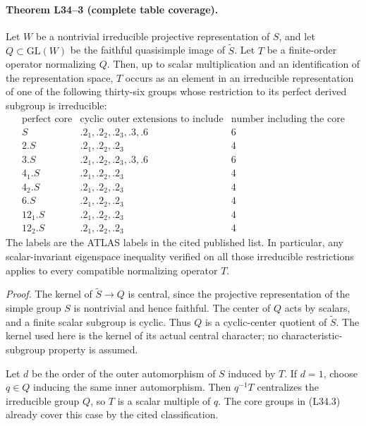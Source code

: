 \paragraph{Theorem L34--3 (complete table coverage).}
Let $W$ be a nontrivial irreducible projective representation of $S$,
and let $Q\subset\mathrm{GL}(W)$ be the faithful quasisimple image
of $\widetilde S$.  Let $T$ be a finite-order operator normalizing
$Q$.  Then, up to scalar multiplication and an identification of the
representation space, $T$ occurs as an element in an irreducible
representation of one of the following thirty-six groups whose
restriction to its perfect derived subgroup is irreducible:
\[
\begin{array}{c|c|c}
\text{perfect core}&\text{cyclic outer extensions to include}
                    &\text{number including the core}\\ \hline
S&.2_1,.2_2,.2_3,.3,.6&6\\
2.S&.2_1,.2_2,.2_3&4\\
3.S&.2_1,.2_2,.2_3,.3,.6&6\\
4_1.S&.2_1,.2_2,.2_3&4\\
4_2.S&.2_1,.2_2,.2_3&4\\
6.S&.2_1,.2_2,.2_3&4\\
12_1.S&.2_1,.2_2,.2_3&4\\
12_2.S&.2_1,.2_2,.2_3&4
\end{array}                                                     \tag{L34.3}
\]
The labels are the ATLAS labels in the cited published list.  In
particular, any scalar-invariant eigenspace inequality verified on
all those irreducible restrictions applies to every compatible
normalizing operator $T$.

\emph{Proof.}
The kernel of $\widetilde S\to Q$ is central, since the projective
representation of the simple group $S$ is nontrivial and hence
faithful.  The center of $Q$ acts by scalars, and a finite scalar
subgroup is cyclic.  Thus $Q$ is a cyclic-center quotient of
$\widetilde S$.  The kernel used here is the kernel of its actual
central character; no characteristic-subgroup property is assumed.

Let $d$ be the order of the outer automorphism of $S$ induced by
$T$.  If $d=1$, choose $q\in Q$ inducing the same inner
automorphism.  Then $q^{-1}T$ centralizes the irreducible group $Q$,
so $T$ is a scalar multiple of $q$.  The core groups in (L34.3)
already cover this case by the cited classification.

